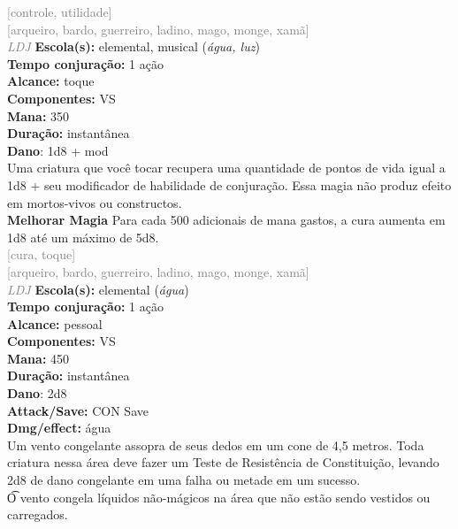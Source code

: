 \documentclass{RPG_Adventure}[2021/10/20]
\begin{document}
{\scriptsize \textcolor{gray}{[controle, utilidade]\\}}
{\scriptsize \textcolor{gray}{[arqueiro, bardo, guerreiro, ladino, mago, monge, xamã]\\}}
{\tiny \textcolor{gray}{\textit{LDJ}}}\jump{}
{\small \t \textbf{Escola(s):} elemental, musical (\textit{água, luz})\\\t \textbf{Tempo conjuração:} 1 ação\\\t \textbf{Alcance:} toque\\\t \textbf{Componentes:} VS\\\t \textbf{Mana:} 350\\\t \textbf{Duração:} instantânea\\\t \textbf{Dano}: 1d8 + mod\\}
{\normalsize Uma criatura que você tocar recupera uma quantidade de pontos de vida igual a 1d8 + seu modificador de habilidade de conjuração. Essa magia não produz efeito em mortos-vivos ou constructos.\\\t \textbf{Melhorar Magia} Para cada 500 adicionais de mana gastos, a cura aumenta em 1d8 até um máximo de 5d8.\\}
{\scriptsize \textcolor{gray}{[cura, toque]\\}}
{\scriptsize \textcolor{gray}{[arqueiro, bardo, guerreiro, ladino, mago, monge, xamã]\\}}
{\tiny \textcolor{gray}{\textit{LDJ}}}\jump{}
{\small \t \textbf{Escola(s):} elemental (\textit{água})\\\t \textbf{Tempo conjuração:} 1 ação\\\t \textbf{Alcance:} pessoal\\\t \textbf{Componentes:} VS\\\t \textbf{Mana:} 450\\\t \textbf{Duração:} instantânea\\\t \textbf{Dano}: 2d8\\\t \textbf{Attack/Save:} CON Save\\\t \textbf{Dmg/effect:} água\\}
{\normalsize Um vento congelante assopra de seus dedos em um cone de 4,5 metros. Toda criatura nessa área deve fazer um Teste de Resistência de Constituição, levando 2d8 de dano congelante em uma falha ou metade em um sucesso.\\\t O vento congela líquidos não-mágicos na área que não estão sendo vestidos ou carregados.\\}
\end{document}
